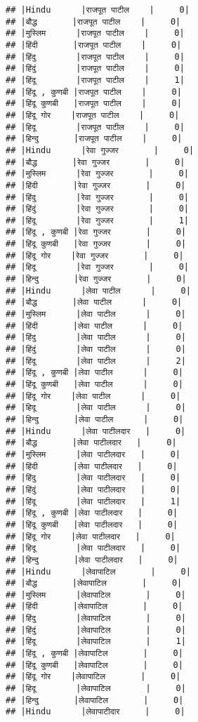 \documentclass[
]{article}
\begin{document}
\begin{verbatim}
## |Hindu      |राजपूत पाटील    |     0|
## |बौद्ध       |राजपूत पाटील    |     0|
## |मुस्लिम      |राजपूत पाटील    |     0|
## |हिंदी       |राजपूत पाटील    |     0|
## |हिंदु        |राजपूत पाटील    |     0|
## |हिंदुं        |राजपूत पाटील    |     0|
## |हिंदू        |राजपूत पाटील    |     1|
## |हिंदू , कुणबी |राजपूत पाटील    |     0|
## |हिंदू कुणबी   |राजपूत पाटील    |     0|
## |हिंदू गोर    |राजपूत पाटील    |     0|
## |हिदू        |राजपूत पाटील    |     0|
## |हिन्दु       |राजपूत पाटील    |     0|
## |Hindu      |रेवा गुज्जर       |     0|
## |बौद्ध       |रेवा गुज्जर       |     0|
## |मुस्लिम      |रेवा गुज्जर       |     0|
## |हिंदी       |रेवा गुज्जर       |     0|
## |हिंदु        |रेवा गुज्जर       |     0|
## |हिंदुं        |रेवा गुज्जर       |     0|
## |हिंदू        |रेवा गुज्जर       |     1|
## |हिंदू , कुणबी |रेवा गुज्जर       |     0|
## |हिंदू कुणबी   |रेवा गुज्जर       |     0|
## |हिंदू गोर    |रेवा गुज्जर       |     0|
## |हिदू        |रेवा गुज्जर       |     0|
## |हिन्दु       |रेवा गुज्जर       |     0|
## |Hindu      |लेवा पाटील      |     0|
## |बौद्ध       |लेवा पाटील      |     0|
## |मुस्लिम      |लेवा पाटील      |     0|
## |हिंदी       |लेवा पाटील      |     0|
## |हिंदु        |लेवा पाटील      |     0|
## |हिंदुं        |लेवा पाटील      |     0|
## |हिंदू        |लेवा पाटील      |     2|
## |हिंदू , कुणबी |लेवा पाटील      |     0|
## |हिंदू कुणबी   |लेवा पाटील      |     0|
## |हिंदू गोर    |लेवा पाटील      |     0|
## |हिदू        |लेवा पाटील      |     0|
## |हिन्दु       |लेवा पाटील      |     0|
## |Hindu      |लेवा पाटीलदार   |     0|
## |बौद्ध       |लेवा पाटीलदार   |     0|
## |मुस्लिम      |लेवा पाटीलदार   |     0|
## |हिंदी       |लेवा पाटीलदार   |     0|
## |हिंदु        |लेवा पाटीलदार   |     0|
## |हिंदुं        |लेवा पाटीलदार   |     0|
## |हिंदू        |लेवा पाटीलदार   |     1|
## |हिंदू , कुणबी |लेवा पाटीलदार   |     0|
## |हिंदू कुणबी   |लेवा पाटीलदार   |     0|
## |हिंदू गोर    |लेवा पाटीलदार   |     0|
## |हिदू        |लेवा पाटीलदार   |     0|
## |हिन्दु       |लेवा पाटीलदार   |     0|
## |Hindu      |लेवापाटिल       |     0|
## |बौद्ध       |लेवापाटिल       |     0|
## |मुस्लिम      |लेवापाटिल       |     0|
## |हिंदी       |लेवापाटिल       |     0|
## |हिंदु        |लेवापाटिल       |     0|
## |हिंदुं        |लेवापाटिल       |     0|
## |हिंदू        |लेवापाटिल       |     1|
## |हिंदू , कुणबी |लेवापाटिल       |     0|
## |हिंदू कुणबी   |लेवापाटिल       |     0|
## |हिंदू गोर    |लेवापाटिल       |     0|
## |हिदू        |लेवापाटिल       |     0|
## |हिन्दु       |लेवापाटिल       |     0|
## |Hindu      |लेवापाटीदार     |     0|

\end{verbatim}
\end{document}
